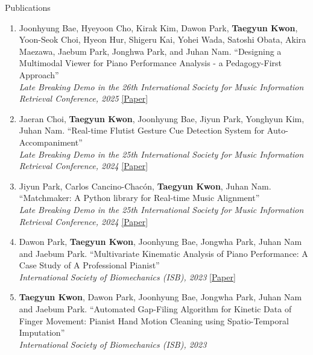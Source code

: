\begin{rSection}{Publications}
\begin{enumerate}
\item \begin{minipage}[t]{\linewidth}Joonhyung Bae, Hyeyoon Cho, Kirak Kim, Dawon Park, \textbf{Taegyun Kwon}, Yoon-Seok Choi, Hyeon Hur, Shigeru Kai, Yohei Wada, Satoshi Obata, Akira Maezawa, Jaebum Park, Jonghwa Park, and Juhan Nam.
``Designing a Multimodal Viewer for Piano Performance Analysis - a Pedagogy-First Approach''\\\textit{Late Breaking Demo in the 26th International Society for Music Information Retrieval Conference, 2025}
\href{https://arxiv.org/abs/2511.21693}{[Paper]}
\end{minipage}
\item \begin{minipage}[t]{\linewidth}Jaeran Choi, \textbf{Taegyun Kwon}, Joonhyung Bae, Jiyun Park, Yonghyun Kim, Juhan Nam.
``Real-time Flutist Gesture Cue Detection System for Auto-Accompaniment''\\\textit{Late Breaking Demo in the 25th International Society for Music Information Retrieval Conference, 2024}
\href{https://ismir2024program.ismir.net/lbd_472.html}{[Paper]}
\end{minipage}
\item \begin{minipage}[t]{\linewidth}Jiyun Park, Carlos Cancino-Chacón, \textbf{Taegyun Kwon}, Juhan Nam.
``Matchmaker: A Python library for Real-time Music Alignment''\\\textit{Late Breaking Demo in the 25th International Society for Music Information Retrieval Conference, 2024}
\href{https://ismir2024program.ismir.net/lbd_435.html}{[Paper]}
\end{minipage}
\item \begin{minipage}[t]{\linewidth}Dawon Park, \textbf{Taegyun Kwon}, Joonhyung Bae, Jongwha Park, Juhan Nam and Jaebum Park.
``Multivariate Kinematic Analysis of Piano Performance: A Case Study of A Professional Pianist''\\\textit{International Society of Biomechanics (ISB), 2023}
\href{https://mac.kaist.ac.kr/pubs/park-isbjsb2023.pdf}{[Paper]}
\end{minipage}
\item \begin{minipage}[t]{\linewidth}\textbf{Taegyun Kwon}, Dawon Park, Joonhyung Bae, Jongwha Park, Juhan Nam and Jaebum Park.
``Automated Gap-Filing Algorithm for Kinetic Data of Finger Movement: Pianist Hand Motion Cleaning using Spatio-Temporal Imputation''\\\textit{International Society of Biomechanics (ISB), 2023}

\end{minipage}
\end{enumerate}
\end{rSection}
